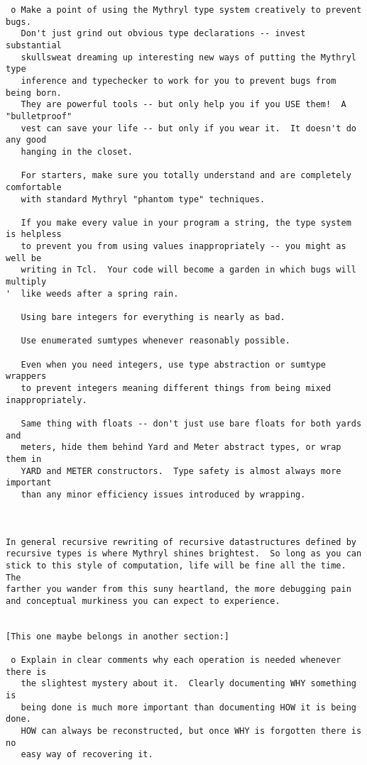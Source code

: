 \begin{verbatim}
 o Make a point of using the Mythryl type system creatively to prevent bugs.
   Don't just grind out obvious type declarations -- invest substantial
   skullsweat dreaming up interesting new ways of putting the Mythryl type
   inference and typechecker to work for you to prevent bugs from being born.
   They are powerful tools -- but only help you if you USE them!  A "bulletproof"
   vest can save your life -- but only if you wear it.  It doesn't do any good
   hanging in the closet.

   For starters, make sure you totally understand and are completely comfortable
   with standard Mythryl "phantom type" techniques.

   If you make every value in your program a string, the type system is helpless
   to prevent you from using values inappropriately -- you might as well be
   writing in Tcl.  Your code will become a garden in which bugs will multiply
'  like weeds after a spring rain.

   Using bare integers for everything is nearly as bad.

   Use enumerated sumtypes whenever reasonably possible.

   Even when you need integers, use type abstraction or sumtype wrappers
   to prevent integers meaning different things from being mixed inappropriately.  

   Same thing with floats -- don't just use bare floats for both yards and
   meters, hide them behind Yard and Meter abstract types, or wrap them in
   YARD and METER constructors.  Type safety is almost always more important
   than any minor efficiency issues introduced by wrapping.



In general recursive rewriting of recursive datastructures defined by
recursive types is where Mythryl shines brightest.  So long as you can
stick to this style of computation, life will be fine all the time. The
farther you wander from this suny heartland, the more debugging pain
and conceptual murkiness you can expect to experience.


[This one maybe belongs in another section:]

 o Explain in clear comments why each operation is needed whenever there is
   the slightest mystery about it.  Clearly documenting WHY something is
   being done is much more important than documenting HOW it is being done.
   HOW can always be reconstructed, but once WHY is forgotten there is no
   easy way of recovering it.







\end{verbatim}
